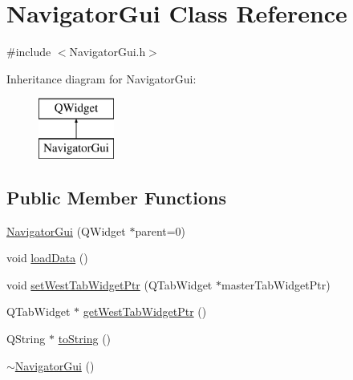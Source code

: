 \hypertarget{class_navigator_gui}{\section{Navigator\-Gui Class Reference}
\label{class_navigator_gui}
}


{\ttfamily \#include $<$Navigator\-Gui.\-h$>$}

Inheritance diagram for Navigator\-Gui\-:\begin{figure}[H]
\begin{center}
\leavevmode
\includegraphics[height=2.000000cm]{class_navigator_gui}
\end{center}
\end{figure}
\subsection*{Public Member Functions}
\begin{DoxyCompactItemize}
\item 
\hyperlink{class_navigator_gui_ac7a57ace6bc543313233afffe9a9073b}{Navigator\-Gui} (Q\-Widget $\ast$parent=0)
\item 
void \hyperlink{class_navigator_gui_a318115279c155077854f5126d290b2b7}{load\-Data} ()
\item 
void \hyperlink{class_navigator_gui_a3d5d2c50735ed741cad32790b6ed8778}{set\-West\-Tab\-Widget\-Ptr} (Q\-Tab\-Widget $\ast$master\-Tab\-Widget\-Ptr)
\item 
Q\-Tab\-Widget $\ast$ \hyperlink{class_navigator_gui_a3eeb5652b2351ecb1988c17ee857c9cf}{get\-West\-Tab\-Widget\-Ptr} ()
\item 
Q\-String $\ast$ \hyperlink{class_navigator_gui_ab077196357f6dc162ef19e7054fbf314}{to\-String} ()
\item 
\hyperlink{class_navigator_gui_a8fc032fe6ad4c935a14ba22853191285}{$\sim$\-Navigator\-Gui} ()
\end{DoxyCompactItemize}
